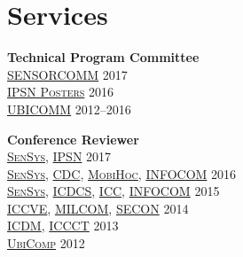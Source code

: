 
\section{\sc Services}
{\bf Technical Program Committee}\\
{\href{http://www.iaria.org/conferences2017/SENSORCOMM17.html}{\textsc{SENSORCOMM}}} \hfill 2017\\
{\href{http://ipsn.acm.org/2016/posters.html}{\textsc{IPSN Posters}}} \hfill 2016\\
{\href{http://www.iaria.org/conferences2016/UBICOMM16.html}{\textsc{UBICOMM}}} \hfill 2012--2016\\
\vspace{-0.6cm}

{\bf Conference Reviewer}\\
{\href{http://sensys.acm.org/2017/}{\textsc{SenSys}}}, {\href{http://ipsn.acm.org/2017/}{\textsc{IPSN}}} \hfill 2017\\
{\href{http://sensys.acm.org/2016/}{\textsc{SenSys}}}, {\href{http://cdc2016.ieeecss.org/}{\textsc{CDC}}}, {\href{http://www.sigmobile.org/mobihoc/2016/}{\textsc{MobiHoc}}}, {\href{http://infocom2016.ieee-infocom.org/}{\textsc{INFOCOM}}} \hfill 2016\\
{\href{http://sensys.acm.org/2015/}{\textsc{SenSys}}}, {\href{http://icdcs-2015.cse.ohio-state.edu/}{\textsc{ICDCS}}}, {\href{http://icc2015.ieee-icc.org/}{\textsc{ICC}}}, {\href{http://infocom2015.ieee-infocom.org/}{\textsc{INFOCOM}}} \hfill 2015\\
{\href{http://www.iccve.org/2014/}{\textsc{ICCVE}}}, {\href{http://www.milcom.org/2014/}{\textsc{MILCOM}}}, {\href{http://secon2014.ieee-secon.org}{\textsc{SECON}}} \hfill 2014\\
{\href{http://icdm2013.rutgers.edu}{\textsc{ICDM}}}, {\href{http://www.mnnit.ac.in/iccct2013}{\textsc{ICCCT}}} \hfill 2013\\
{\href{http://www.ubicomp.org/ubicomp2012}{\textsc{UbiComp}}} \hfill 2012\\
\vspace{-0.6cm}


